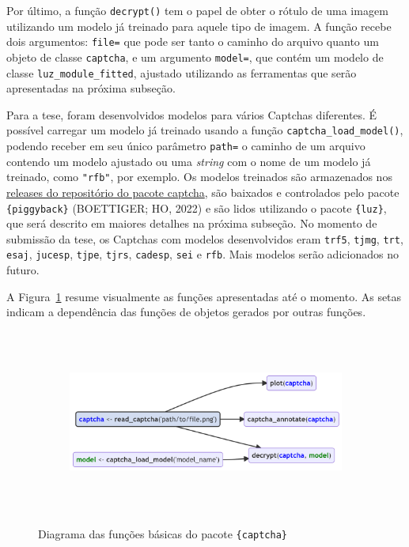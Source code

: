\documentclass[12pt,twoside,brazilian]{book}
\begin{document}
Por último, a função \texttt{decrypt()} tem o papel de obter o rótulo de
uma imagem utilizando um modelo já treinado para aquele tipo de imagem.
A função recebe dois argumentos: \texttt{file=} que pode ser tanto o
caminho do arquivo quanto um objeto de classe \texttt{captcha}, e um
argumento \texttt{model=}, que contém um modelo de classe
\texttt{luz\_module\_fitted}, ajustado utilizando as ferramentas que
serão apresentadas na próxima subseção.

Para a tese, foram desenvolvidos modelos para vários Captchas
diferentes. É possível carregar um modelo já treinado usando a função
\texttt{captcha\_load\_model()}, podendo receber em seu único parâmetro
\texttt{path=} o caminho de um arquivo contendo um modelo ajustado ou
uma \emph{string} com o nome de um modelo já treinado, como
\texttt{"rfb"}, por exemplo. Os modelos treinados são armazenados nos
\href{https://github.com/decryptr/captcha/releases}{releases do
repositório do pacote captcha}, são baixados e controlados pelo pacote
\texttt{\{piggyback\}} (BOETTIGER; HO, 2022) e são lidos utilizando o
pacote \texttt{\{luz\}}, que será descrito em maiores detalhes na
próxima subseção. No momento de submissão da tese, os Captchas com
modelos desenvolvidos eram \texttt{trf5}, \texttt{tjmg}, \texttt{trt},
\texttt{esaj}, \texttt{jucesp}, \texttt{tjpe}, \texttt{tjrs},
\texttt{cadesp}, \texttt{sei} e \texttt{rfb}. Mais modelos serão
adicionados no futuro.

A Figura~\ref{fig-diagrama-captcha-simples} resume visualmente as
funções apresentadas até o momento. As setas indicam a dependência das
funções de objetos gerados por outras funções.

\begin{figure}

{\centering 

\begin{figure}[H]

{\centering \includegraphics[width=6.61in,height=2.38in]{./resultados_files/figure-latex/mermaid-figure-1.png}

}

\end{figure}

}

\caption{\label{fig-diagrama-captcha-simples}Diagrama das funções
básicas do pacote \texttt{\{captcha\}}}

\end{figure}
\end{document}
